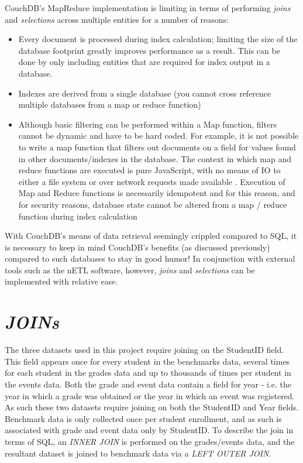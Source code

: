 \label{chapter-analysis}
CouchDB's MapReduce implementation is limiting in terms of performing \textit{joins} and \textit{selections} across multiple entities for a number of reasons:

\begin{itemize}
    \item Every document is processed during index calculation; limiting the size of the database footprint greatly improves performance as a result. This can be done by only including entities that are required for index output in a database.
    \item Indexes are derived from a single database (you cannot cross reference multiple databases from a map or reduce function)
    \item Although basic filtering can be performed within a Map function, filters cannot be dynamic and have to be hard coded. For example, it is not possible to write a map function that filters out documents on a field for values found in other documents/indexes in the database. The context in which map and reduce functions are executed is pure JavaScript, with no means of IO to either a file system or over network requests made available \cite{slack28Feb}. Execution of Map and Reduce functions is necessarily idempotent and for this reason, and for security reasons, database state cannot be altered from a map / reduce function during index calculation
\end{itemize}

With CouchDB's means of data retrieval seemingly crippled compared to SQL, it is necessary to keep in mind CouchDB's benefits (as discussed previously) compared to such databases to stay in good humor! In conjunction with external tools such as the nETL software, however, \textit{joins} and \textit{selections} can be implemented with relative ease.

\section{\textit{JOINs}}
The three datasets used in this project require joining on the StudentID field. This field appears once for every student in the benchmarks data, several times for each student in the grades data and up to thousands of times per student in the events data. Both the grade and event data contain a field for year - i.e. the year in which a grade was obtained or the year in which an event was registered. As such these two datasets require joining on both the StudentID and Year fields. Benchmark data is only collected once per student enrollment, and as such is associated with grade and event data only by StudentID. To describe the join in terms of SQL, an \textit{INNER JOIN} is performed on the grades/events data, and the resultant dataset is joined to benchmark data via a \textit{LEFT OUTER JOIN}.

